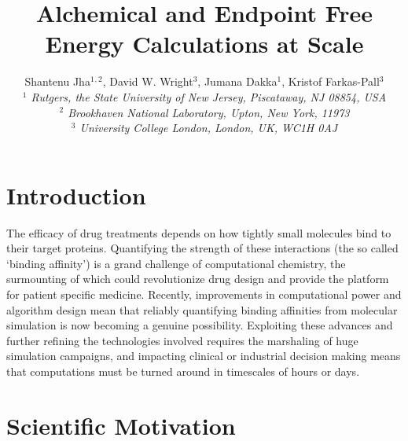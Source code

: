 \documentclass[conference]{IEEEtran}
\begin{document}
\title{Alchemical and Endpoint Free Energy Calculations at Scale}


\author{Shantenu Jha$^{1}$$^{,2}$, David W. Wright$^{3}$, Jumana Dakka$^{1}$,  Kristof Farkas-Pall$^{3}$\\
   \small{\emph{$^{1}$ Rutgers, the State University of New Jersey, Piscataway, NJ 08854, USA}}\\
   \small{\emph{$^{2}$ Brookhaven National Laboratory, Upton, New York, 11973}}\\
   \small{\emph{$^{3}$ University College London, London, UK, WC1H 0AJ}}
}


\date{}
\maketitle

\begin{abstract} 

\end{abstract}


\section{Introduction}\label{sec:intro}

The efficacy of drug treatments depends on how tightly small molecules bind to their target proteins. Quantifying the strength of these interactions (the so called ‘binding affinity’) is a grand challenge of computational chemistry, the surmounting of which could revolutionize drug design and provide the platform for patient specific medicine. Recently, improvements in computational power and algorithm design mean that reliably quantifying binding affinities from molecular simulation is now becoming a genuine possibility. Exploiting these advances and further refining the technologies involved requires the marshaling of huge simulation campaigns, and impacting clinical or industrial decision making means that computations must be turned around in timescales of hours or days. 



\section{Scientific Motivation}\label{sec:motivation}
\end{document}
